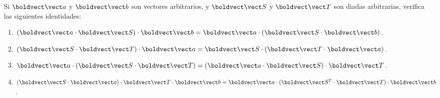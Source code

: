 \documentclass[../main.tex]{subfiles}
\begin{document}
\begin{problema}
	Si \(\vb{a}\) y \(\vb{b}\) son vectores arbitrarios, y \(\vb{S}\) y \(\vb{T}\)
	son diadas arbitrarias, verifica las siguientes identidades:
	\begin{enumerate}
		\item \(\dotp{(\dotp{\vb{a}}{\vb{S}})}{\vb{b}} = \dotp{\vb{a}}{(\dotp{\vb{S}}{\vb{b}})}\).
		\item \(\dotp{(\dotp{\vb{S}}{\vb{T}})}{\vb{a}} = \dotp{\vb{S}}{(\dotp{\vb{T}}{\vb{a}})}\).
		\item \(\dotp{\vb{a}}{(\dotp{\vb{S}}{\vb{T}})} = \dotp{(\dotp{\vb{a}}{\vb{S}})}{\vb{T}}\).
		\item \(\dotp{(\dotp{\vb{S}}{\vb{a}})}{\dotp{\vb{T}}{\vb{b}}} = \dotp{\vb{a}}{\dotp{(\dotp{\vb{S}^{T}}{\vb{T}})}{\vb{b}}}\).
	\end{enumerate}
\end{problema}
\end{document}
